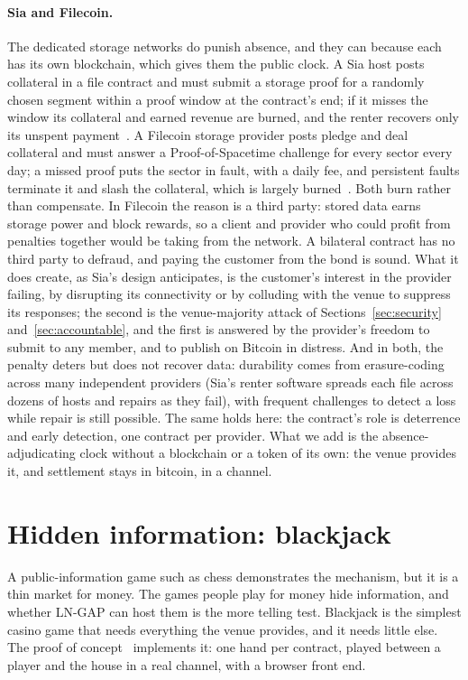 \documentclass[11pt]{article}
\begin{document}
\paragraph{Sia and Filecoin.} The dedicated storage networks do punish
absence, and they can because each has its own blockchain, which gives
them the public clock. A Sia host posts collateral in a file contract
and must submit a storage proof for a randomly chosen segment within a
proof window at the contract's end; if it misses the window its
collateral and earned revenue are burned, and the renter recovers only
its unspent payment~\cite{sia}. A Filecoin storage provider posts pledge
and deal collateral and must answer a Proof-of-Spacetime challenge for
every sector every day; a missed proof puts the sector in fault, with a
daily fee, and persistent faults terminate it and slash the collateral,
which is largely burned~\cite{filecoin}. Both burn rather than
compensate. In Filecoin the reason is a third party: stored data earns
storage power and block rewards, so a client and provider who could
profit from penalties together would be taking from the network. A
bilateral contract has no third party to defraud, and paying the
customer from the bond is sound. What it does create, as Sia's design
anticipates, is the customer's interest in the provider failing, by
disrupting its connectivity or by colluding with the venue to suppress
its responses; the second is the venue-majority attack of
Sections~\ref{sec:security} and~\ref{sec:accountable}, and the first is
answered by the provider's freedom to submit to any member, and to
publish on Bitcoin in distress. And in both, the penalty
deters but does not recover data: durability comes from erasure-coding
across many independent providers (Sia's renter software spreads each
file across dozens of hosts and repairs as they fail), with frequent
challenges to detect a loss while repair is still possible. The same
holds here: the contract's role is deterrence and early detection, one
contract per provider. What we add is the absence-adjudicating clock
without a blockchain or a token of its own: the venue provides it, and
settlement stays in bitcoin, in a channel.

\section{Hidden information: blackjack}
\label{sec:blackjack}

A public-information game such as chess demonstrates the mechanism, but
it is a thin market for money. The games people play for money hide
information, and whether LN-GAP can host them is the more telling test.
Blackjack is the simplest casino game that needs everything the venue
provides, and it needs little else. The proof of
concept~\cite{lngapcode} implements it: one hand per contract, played
between a player and the house in a real channel, with a browser front
end.
\end{document}
